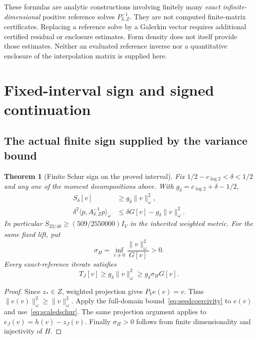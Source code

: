 \documentclass[11pt,a4paper]{article}
\numberwithin{equation}{section}
\newtheorem{theorem}{Theorem}[section]
\theoremstyle{remark}
\newcommand{\ip}[2]{\langle #1,#2\rangle}
\newcommand{\norm}[1]{\lVert #1\rVert}
\begin{document}
These formulas are analytic constructions involving finitely many \emph{exact infinite-dimensional} positive reference solves $P_{\delta,Z}^{-1}$. They are not computed finite-matrix certificates. Replacing a reference solve by a Galerkin vector requires additional certified residual or enclosure estimates. Form density does not itself provide those estimates. Neither an evaluated reference inverse nor a quantitative enclosure of the interpolation matrix is supplied here.

\section{Fixed-interval sign and signed continuation}\label{sec:continuation}

\subsection{The actual finite sign supplied by the variance bound}

\begin{theorem}[Finite Schur sign on the proved interval]\label{thm:finiteseed}
Fix $1/2-c_{\log2}<\delta<1/2$ and any one of the moment decompositions above. With $g_\delta=c_{\log2}+\delta-1/2$,
\begin{align}
 S_\delta[v]&\ge g_\delta\norm v_\omega^2,\label{eq:Sseed}\\
 \delta^2\ip p{A_{\delta,Z}^{-1}p}_\omega
 &\le\delta G[v]-g_\delta\norm v_\omega^2.\label{eq:signedresponse}
\end{align}
In particular $S_{23/48}\ge(509/2550000)I_V$ in the inherited weighted metric. For the same fixed lift, put
\begin{equation}\label{eq:sigmaH}
 \sigma_H=\inf_{v\ne0}\frac{\norm v_\omega^2}{G[v]}>0.
\end{equation}
Every exact-reference iterate satisfies
\begin{equation}\label{eq:Tseed}
 T_J[v]\ge g_\delta\norm v_\omega^2\ge g_\delta\sigma_HG[v].
\end{equation}
\end{theorem}
\begin{proof}
Since $z_*\in Z$, weighted projection gives $P_Ve(v)=v$. Thus
$\norm{e(v)}_\omega^2\ge\norm v_\omega^2$. Apply the full-domain bound~\eqref{eq:seedcoercivity} to $e(v)$ and use~\eqref{eq:scaledschur}. The same projection argument applies to $e_J(v)=h(v)-z_J(v)$. Finally $\sigma_H>0$ follows from finite dimensionality and injectivity of $H$.
\end{proof}
\end{document}
